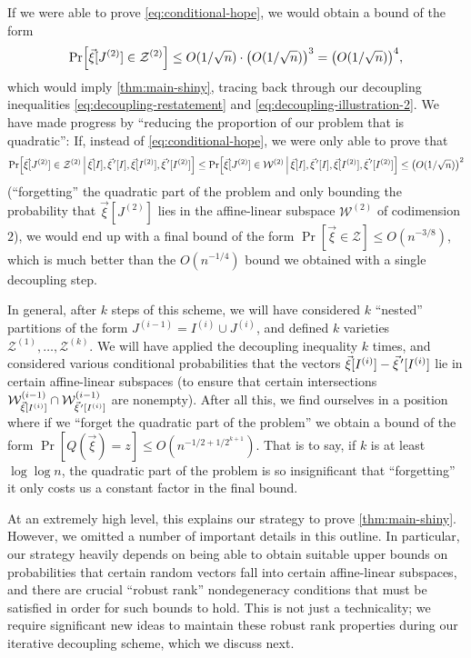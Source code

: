 \documentclass[english]{article}
\theoremstyle{remark}
\numberwithin{equation}{section}
\numberwithin{figure}{section}
\newcommand{\pvec}[1]{\vec{#1}\mkern2mu\vphantom{#1}'}
\newcommand{\mc}{\mathcal}
\let\originalleft\left
\let\originalright\right
\renewcommand{\left}{\mathopen{}\mathclose\bgroup\originalleft}
\renewcommand{\right}{\aftergroup\egroup\originalright}
\begin{document}
If we were able to prove \cref{eq:conditional-hope}, we would obtain a bound of the form
\[\Pr\Bigl[\vec \xi[J^{(2)}]\in \mc Z^{(2)}\Bigr]\le O(1/\sqrt{n})\cdot \left(O(1/\sqrt{n})\right)^{3}=\left(O(1/\sqrt{n})\right)^{4},\]
which would imply \cref{thm:main-shiny}, tracing back through our decoupling inequalities \cref{eq:decoupling-restatement} and \cref{eq:decoupling-illustration-2}. We have made progress by ``reducing the proportion of our problem that is quadratic'': If, instead of \cref{eq:conditional-hope}, we were only able to prove that
\[\Pr\Bigl[\vec \xi[J^{(2)}]\in\mathcal{Z}^{(2)}\,\Big|\,\vec \xi[I],\pvec{\xi}[I],\vec \xi[I^{(2)}],\pvec{\xi}[I^{(2)}]\Bigr]\le \Pr\Bigl[\vec \xi[J^{(2)}]\in\mathcal{W}^{(2)}\,\Big|\,\vec \xi[I],\pvec{\xi}[I],\vec \xi[I^{(2)}],\pvec{\xi}[I^{(2)}]\Bigr]\le\left(O(1/\sqrt{n})\right)^{2}\]
(``forgetting'' the quadratic part of the problem and only bounding the probability that $\vec \xi[J^{(2)}]$ lies in the affine-linear subspace $\mathcal{W}^{(2)}$ of codimension $2$), we would end up with a final bound of the form  $\Pr[\vec \xi\in \mc Z]\le O(n^{-3/8})$, which is much better than the $O(n^{-1/4})$ bound we obtained with a single decoupling step.

In general, after $k$ steps of this scheme, we will have considered $k$ ``nested'' partitions of the form $J^{(i-1)}=I^{(i)}\cup J^{(i)}$, and defined $k$ varieties $\mc Z^{(1)},\dots,\mc Z^{(k)}$. We will have applied the decoupling inequality $k$ times, and considered various conditional probabilities that the vectors $\vec \xi[I^{(i)}]-\pvec{\xi}[I^{(i)}]$ lie in certain affine-linear subspaces (to ensure that certain intersections $\mathcal{W}^{(i-1)}_{\vec \xi[I^{(i)}]}\cap\mathcal{W}^{(i-1)}_{\pvec\xi[I^{(i)}]}$ are nonempty). After all this, we find ourselves in a position where if we ``forget the quadratic part of the problem'' we obtain a bound of the form $\Pr[Q(\vec \xi)=z]\le O(n^{-1/2+1/2^{k+1}})$. That is to say, if $k$ is at least $\log \log n$, the quadratic part of the problem is so insignificant that ``forgetting'' it only costs us a constant factor in the final bound.

At an extremely high level, this explains our strategy to prove \cref{thm:main-shiny}. However, we omitted a number of important details in this outline. In particular, our strategy heavily depends on being able to obtain suitable upper bounds on probabilities that certain random vectors fall into certain affine-linear subspaces, and there are crucial ``robust rank'' nondegeneracy conditions that must be satisfied in order for such bounds to hold. This is not just a technicality; we require significant new ideas to maintain these robust rank properties during our iterative decoupling scheme, which we discuss next.
\end{document}
